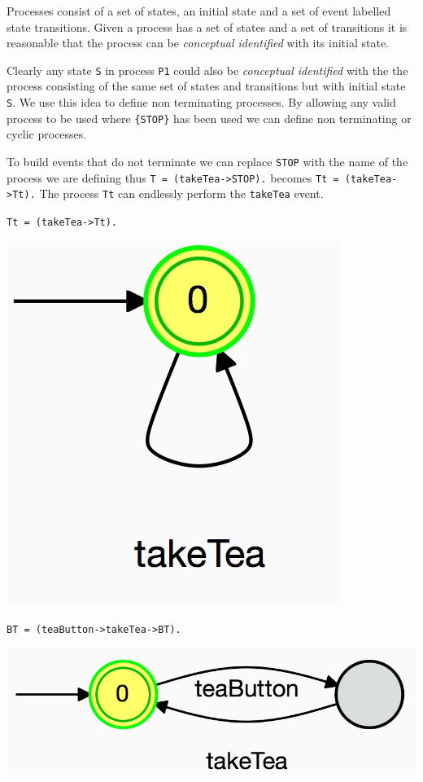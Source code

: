 \documentclass[]{article}
\begin{document}
Processes consist of a set of states, an initial state  and a set of event labelled state transitions. Given  a process has a set of states and a set of transitions it is reasonable that the process can be \emph{conceptual identified} with its initial state. 


Clearly any state \verb$S$ in process \verb|P1| could also  be \emph{conceptual identified}  with the the process consisting of the same set of states and transitions but with initial state \verb$S$.  We use this idea to define non terminating processes.  By allowing any valid process to be used where \verb${STOP}$ has been used we can define non terminating or cyclic processes.


To build events that do not terminate we can replace \verb$STOP$ with the name of the process we are defining thus \verb$T = (takeTea->STOP).$ becomes \verb$Tt = (takeTea->Tt).$  The  process \verb$Tt$ can endlessly perform the \verb$takeTea$ event.

\noindent
\begin{minipage}{0.45\textwidth}\begin{center}
\verb$Tt = (takeTea->Tt).$

\includegraphics[scale=0.15]{Tt.jpg} \end{center}\end{minipage}
\begin{minipage}{0.45\textwidth}
\begin{center}
\verb$BT = (teaButton->takeTea->BT).$

\includegraphics[scale=0.15]{BT.jpg}\end{center} \end{minipage}
\end{document}
